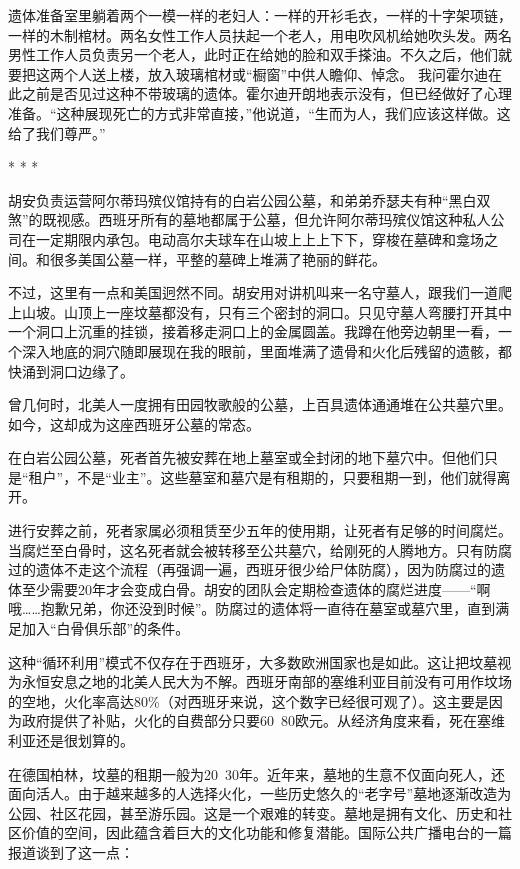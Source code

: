 \documentclass[12pt,oneside]{book}
\begin{document}
\begin{bookref}[frametitle={\cite{好好告别}}]
遗体准备室里躺着两个一模一样的老妇人：一样的开衫毛衣，一样的十字架项链，一样的木制棺材。两名女性工作人员扶起一个老人，用电吹风机给她吹头发。两名男性工作人员负责另一个老人，此时正在给她的脸和双手搽油。不久之后，他们就要把这两个人送上楼，放入玻璃棺材或“橱窗”中供人瞻仰、悼念。
我问霍尔迪在此之前是否见过这种不带玻璃的遗体。霍尔迪开朗地表示没有，但已经做好了心理准备。“这种展现死亡的方式非常直接，”他说道，“生而为人，我们应该这样做。这给了我们尊严。”

\begin{center}
* * *
\end{center}

胡安负责运营阿尔蒂玛殡仪馆持有的白岩公园公墓，和弟弟乔瑟夫有种“黑白双煞”的既视感。西班牙所有的墓地都属于公墓，但允许阿尔蒂玛殡仪馆这种私人公司在一定期限内承包。电动高尔夫球车在山坡上上上下下，穿梭在墓碑和龛场之间。和很多美国公墓一样，平整的墓碑上堆满了艳丽的鲜花。

不过，这里有一点和美国迥然不同。胡安用对讲机叫来一名守墓人，跟我们一道爬上山坡。山顶上一座坟墓都没有，只有三个密封的洞口。只见守墓人弯腰打开其中一个洞口上沉重的挂锁，接着移走洞口上的金属圆盖。我蹲在他旁边朝里一看，一个深入地底的洞穴随即展现在我的眼前，里面堆满了遗骨和火化后残留的遗骸，都快涌到洞口边缘了。

曾几何时，北美人一度拥有田园牧歌般的公墓，上百具遗体通通堆在公共墓穴里。如今，这却成为这座西班牙公墓的常态。

在白岩公园公墓，死者首先被安葬在地上墓室或全封闭的地下墓穴中。但他们只是“租户”，不是“业主”。这些墓室和墓穴是有租期的，只要租期一到，他们就得离开。

进行安葬之前，死者家属必须租赁至少五年的使用期，让死者有足够的时间腐烂。当腐烂至白骨时，这名死者就会被转移至公共墓穴，给刚死的人腾地方。只有防腐过的遗体不走这个流程（再强调一遍，西班牙很少给尸体防腐），因为防腐过的遗体至少需要20年才会变成白骨。胡安的团队会定期检查遗体的腐烂进度——“啊哦……抱歉兄弟，你还没到时候”。防腐过的遗体将一直待在墓室或墓穴里，直到满足加入“白骨俱乐部”的条件。

这种“循环利用”模式不仅存在于西班牙，大多数欧洲国家也是如此。这让把坟墓视为永恒安息之地的北美人民大为不解。西班牙南部的塞维利亚目前没有可用作坟场的空地，火化率高达80\%（对西班牙来说，这个数字已经很可观了）。这主要是因为政府提供了补贴，火化的自费部分只要60~80欧元。从经济角度来看，死在塞维利亚还是很划算的。

在德国柏林，坟墓的租期一般为20~30年。近年来，墓地的生意不仅面向死人，还面向活人。由于越来越多的人选择火化，一些历史悠久的“老字号”墓地逐渐改造为公园、社区花园，甚至游乐园。这是一个艰难的转变。墓地是拥有文化、历史和社区价值的空间，因此蕴含着巨大的文化功能和修复潜能。国际公共广播电台的一篇报道谈到了这一点：


\end{bookref}
\end{document}
